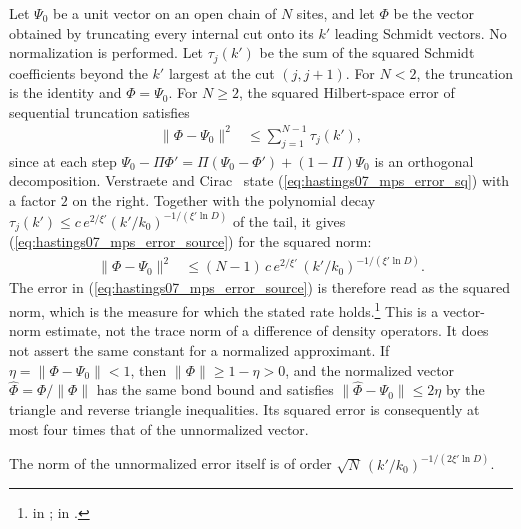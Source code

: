 \documentclass{article}
\begin{document}
Let $\Psi_0$ be a unit vector on an open chain of $N$ sites, and let
$\Phi$ be the vector obtained by truncating every internal cut onto its $k'$
leading Schmidt vectors. No normalization is performed. Let $\tau_j(k')$
be the sum of the squared Schmidt coefficients beyond the $k'$ largest at the cut
$(j,j+1)$. For $N<2$, the truncation is the identity and $\Phi=\Psi_0$.
For $N\ge2$, the squared Hilbert-space error of sequential truncation satisfies
\begin{align}
    \lVert\Phi-\Psi_0\rVert^2
     & \le\sum_{j=1}^{N-1}\tau_j(k'),
    \label{eq:hastings07_mps_error_sq}
\end{align}
since at each step $\Psi_0-\Pi\Phi'=\Pi(\Psi_0-\Phi')+(1-\Pi)\Psi_0$ is an
orthogonal decomposition. Verstraete and
Cirac~\cite{VerstraeteCirac2006Faithfully} state
(\ref{eq:hastings07_mps_error_sq}) with a factor $2$ on the right. Together
with the polynomial decay
$\tau_j(k')\le c\,e^{2/\xi'}(k'/k_0)^{-1/(\xi'\ln D)}$ of the tail, it gives
(\ref{eq:hastings07_mps_error_source}) for the squared norm:
\begin{align}
    \lVert\Phi-\Psi_0\rVert^2
     & \le(N-1)\,c\,e^{2/\xi'}\,(k'/k_0)^{-1/(\xi'\ln D)}.
    \label{eq:hastings07_mps_error_sq_final}
\end{align}
The error in (\ref{eq:hastings07_mps_error_source}) is therefore read as the
squared norm, which is the measure for which the stated rate
holds.\footnote{
    in ;
     in
    .}
This is a vector-norm estimate, not the trace norm of a difference of
density operators. It does not assert the same constant for a normalized
approximant. If $\eta=\lVert\Phi-\Psi_0\rVert<1$, then
$\lVert\Phi\rVert\ge1-\eta>0$, and the normalized vector
$\widehat\Phi=\Phi/\lVert\Phi\rVert$ has the same bond bound and satisfies
$\lVert\widehat\Phi-\Psi_0\rVert\le2\eta$ by the triangle and reverse
triangle inequalities. Its squared error is consequently at most four times
that of the unnormalized vector.

The norm of the unnormalized error itself is of order
$\sqrt N\,(k'/k_0)^{-1/(2\xi'\ln D)}$.



\end{document}

